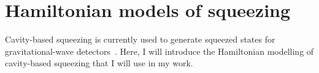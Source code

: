 

\section{Hamiltonian models of squeezing}
\label{sec:Hamiltonian_modelling}


Cavity-based squeezing is currently used to generate squeezed states for gravitational-wave detectors~\cite{}. Here, I will introduce the Hamiltonian modelling of cavity-based squeezing that I will use in my work.

